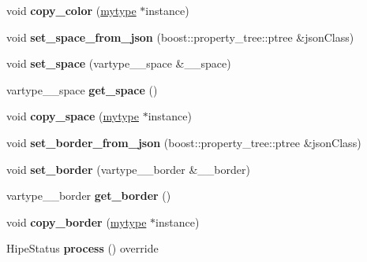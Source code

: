 \begin{DoxyCompactItemize}
void {\bfseries copy\+\_\+color} (\hyperlink{classfilter_1_1algos_1_1_bilateral_filter}{mytype} $\ast$instance)
\item 
\mbox{\label{classfilter_1_1algos_1_1_bilateral_filter_a7965c48287c34eb12a00024ef2b0ee56}} 
void {\bfseries set\+\_\+space\+\_\+from\+\_\+json} (boost\+::property\+\_\+tree\+::ptree \&json\+Class)
\item 
\mbox{\label{classfilter_1_1algos_1_1_bilateral_filter_afca21998adf6ea3a2a054276aab54381}} 
void {\bfseries set\+\_\+space} (vartype\+\_\+\+\_\+space \&\+\_\+\+\_\+space)
\item 
\mbox{\label{classfilter_1_1algos_1_1_bilateral_filter_aa47c592a00f4cfc15f97d24c1adc06d5}} 
vartype\+\_\+\+\_\+space {\bfseries get\+\_\+space} ()
\item 
\mbox{\label{classfilter_1_1algos_1_1_bilateral_filter_a92084fa723d583f298701041a46e4b9a}} 
void {\bfseries copy\+\_\+space} (\hyperlink{classfilter_1_1algos_1_1_bilateral_filter}{mytype} $\ast$instance)
\item 
\mbox{\label{classfilter_1_1algos_1_1_bilateral_filter_a12f4d5e0f2e32df6a63c19c762914a43}} 
void {\bfseries set\+\_\+border\+\_\+from\+\_\+json} (boost\+::property\+\_\+tree\+::ptree \&json\+Class)
\item 
\mbox{\label{classfilter_1_1algos_1_1_bilateral_filter_a77d0a143be02bf724978bc1fa382e4c5}} 
void {\bfseries set\+\_\+border} (vartype\+\_\+\+\_\+border \&\+\_\+\+\_\+border)
\item 
\mbox{\label{classfilter_1_1algos_1_1_bilateral_filter_a89cc37eef4ee3c59534f7dbb40850125}} 
vartype\+\_\+\+\_\+border {\bfseries get\+\_\+border} ()
\item 
\mbox{\label{classfilter_1_1algos_1_1_bilateral_filter_a99702ffcc44c830d712803994e233b84}} 
void {\bfseries copy\+\_\+border} (\hyperlink{classfilter_1_1algos_1_1_bilateral_filter}{mytype} $\ast$instance)
\item 
\mbox{\label{classfilter_1_1algos_1_1_bilateral_filter_a7c91ab4447b85fb5b0ea0ac6121fc097}} 
Hipe\+Status {\bfseries process} () override
\end{DoxyCompactItemize}
